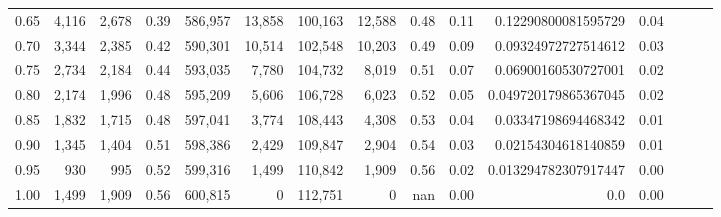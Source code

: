 \begin{tabular}{rrrrrrrrrrrrrrr}
0.65 &    4,116 &   2,678 &  0.39 &  586,957 &   13,858 &  100,163 &   12,588 &  0.48 &  0.11 &   0.12290800081595729 &      0.04 \\
0.70 &    3,344 &   2,385 &  0.42 &  590,301 &   10,514 &  102,548 &   10,203 &  0.49 &  0.09 &   0.09324972727514612 &      0.03 \\
0.75 &    2,734 &   2,184 &  0.44 &  593,035 &    7,780 &  104,732 &    8,019 &  0.51 &  0.07 &   0.06900160530727001 &      0.02 \\
0.80 &    2,174 &   1,996 &  0.48 &  595,209 &    5,606 &  106,728 &    6,023 &  0.52 &  0.05 &  0.049720179865367045 &      0.02 \\
0.85 &    1,832 &   1,715 &  0.48 &  597,041 &    3,774 &  108,443 &    4,308 &  0.53 &  0.04 &   0.03347198694468342 &      0.01 \\
0.90 &    1,345 &   1,404 &  0.51 &  598,386 &    2,429 &  109,847 &    2,904 &  0.54 &  0.03 &   0.02154304618140859 &      0.01 \\
0.95 &      930 &     995 &  0.52 &  599,316 &    1,499 &  110,842 &    1,909 &  0.56 &  0.02 &  0.013294782307917447 &      0.00 \\
1.00 &    1,499 &   1,909 &  0.56 &  600,815 &        0 &  112,751 &        0 &   nan &  0.00 &                   0.0 &      0.00 \\
\bottomrule
\end{tabular}
